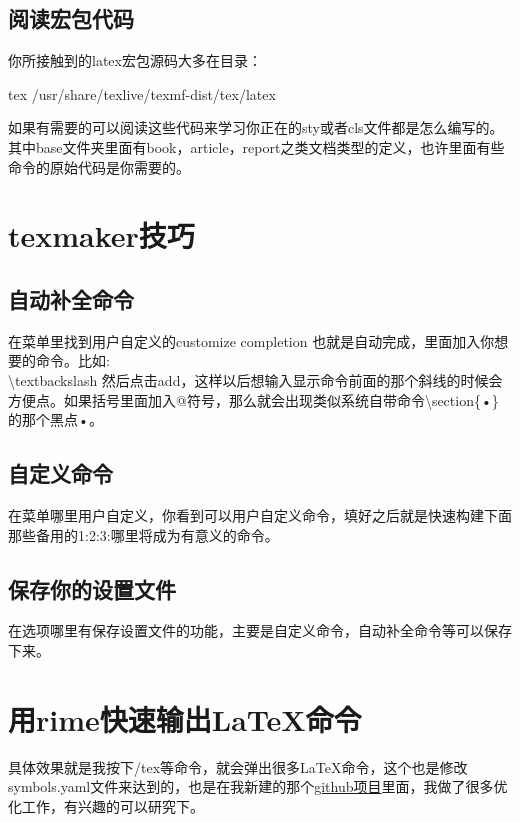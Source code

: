 \documentclass[11pt,oneside]{book}
\begin{document}
\subsection{阅读宏包代码}
你所接触到的latex宏包源码大多在目录：
\begin{tcbcode}{tex}
/usr/share/texlive/texmf-dist/tex/latex
\end{tcbcode}

如果有需要的可以阅读这些代码来学习你正在的sty或者cls文件都是怎么编写的。其中base文件夹里面有book，article，report之类文档类型的定义，也许里面有些命令的原始代码是你需要的。


\section{texmaker技巧}
\subsection{自动补全命令}
在菜单里找到用户自定义的customize completion 也就是自动完成，里面加入你想要的命令。比如:\\
\textbackslash textbackslash 然后点击add，这样以后想输入显示命令前面的那个斜线的时候会方便点。如果括号里面加入@符号，那么就会出现类似系统自带命令\textbackslash section\{•\}的那个黑点•。

\subsection{自定义命令}
在菜单哪里用户自定义，你看到可以用户自定义命令，填好之后就是快速构建下面那些备用的1:2:3:哪里将成为有意义的命令。

\subsection{保存你的设置文件}
在选项哪里有保存设置文件的功能，主要是自定义命令，自动补全命令等可以保存下来。

\section{用rime快速输出\LaTeX 命令}
具体效果就是我按下/tex等命令，就会弹出很多\LaTeX 命令，这个也是修改symbols.yaml文件来达到的，也是在我新建的那个\href{https://github.com/a358003542/rime-symbols-yaml}{github项目}里面，我做了很多优化工作，有兴趣的可以研究下。
\end{document}
